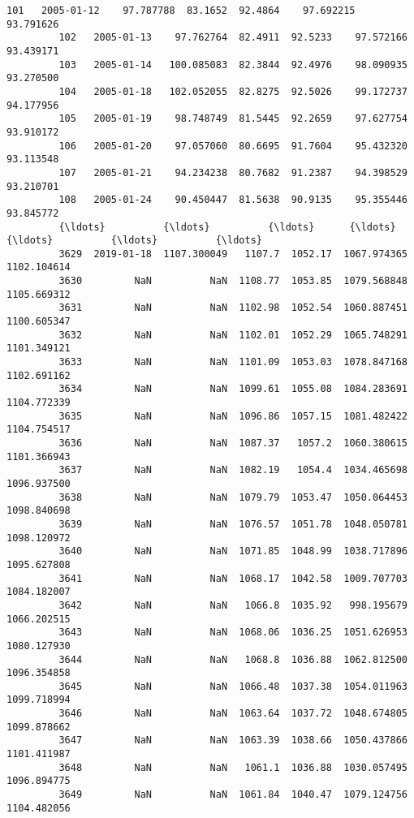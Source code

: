 \documentclass[11pt]{article}
\begin{document}
\begin{Verbatim}[commandchars=\\\{\}]
         101   2005-01-12    97.787788  83.1652  92.4864    97.692215    93.791626   
         102   2005-01-13    97.762764  82.4911  92.5233    97.572166    93.439171   
         103   2005-01-14   100.085083  82.3844  92.4976    98.090935    93.270500   
         104   2005-01-18   102.052055  82.8275  92.5026    99.172737    94.177956   
         105   2005-01-19    98.748749  81.5445  92.2659    97.627754    93.910172   
         106   2005-01-20    97.057060  80.6695  91.7604    95.432320    93.113548   
         107   2005-01-21    94.234238  80.7682  91.2387    94.398529    93.210701   
         108   2005-01-24    90.450447  81.5638  90.9135    95.355446    93.845772   
         {\ldots}          {\ldots}          {\ldots}      {\ldots}      {\ldots}          {\ldots}          {\ldots}   
         3629  2019-01-18  1107.300049   1107.7  1052.17  1067.974365  1102.104614   
         3630         NaN          NaN  1108.77  1053.85  1079.568848  1105.669312   
         3631         NaN          NaN  1102.98  1052.54  1060.887451  1100.605347   
         3632         NaN          NaN  1102.01  1052.29  1065.748291  1101.349121   
         3633         NaN          NaN  1101.09  1053.03  1078.847168  1102.691162   
         3634         NaN          NaN  1099.61  1055.08  1084.283691  1104.772339   
         3635         NaN          NaN  1096.86  1057.15  1081.482422  1104.754517   
         3636         NaN          NaN  1087.37   1057.2  1060.380615  1101.366943   
         3637         NaN          NaN  1082.19   1054.4  1034.465698  1096.937500   
         3638         NaN          NaN  1079.79  1053.47  1050.064453  1098.840698   
         3639         NaN          NaN  1076.57  1051.78  1048.050781  1098.120972   
         3640         NaN          NaN  1071.85  1048.99  1038.717896  1095.627808   
         3641         NaN          NaN  1068.17  1042.58  1009.707703  1084.182007   
         3642         NaN          NaN   1066.8  1035.92   998.195679  1066.202515   
         3643         NaN          NaN  1068.06  1036.25  1051.626953  1080.127930   
         3644         NaN          NaN   1068.8  1036.88  1062.812500  1096.354858   
         3645         NaN          NaN  1066.48  1037.38  1054.011963  1099.718994   
         3646         NaN          NaN  1063.64  1037.72  1048.674805  1099.878662   
         3647         NaN          NaN  1063.39  1038.66  1050.437866  1101.411987   
         3648         NaN          NaN   1061.1  1036.88  1030.057495  1096.894775   
         3649         NaN          NaN  1061.84  1040.47  1079.124756  1104.482056   

\end{Verbatim}
\end{document}

